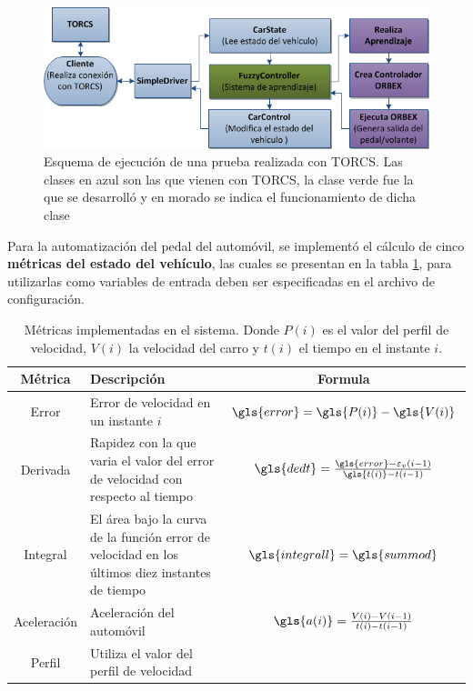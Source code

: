 \begin{figure}[!htb]
\centering
\includegraphics[width=0.6\linewidth]{figures/Diseno.png}
\caption{Esquema de ejecución de una prueba realizada con TORCS. Las clases en azul son las que vienen con TORCS, la clase verde fue la que se desarrolló y en morado se indica el funcionamiento de dicha clase}
\label{fig:esqT}
\end{figure}     

Para la automatización del pedal del automóvil, se implementó el cálculo de cinco \textbf{métricas del estado del vehículo}, las cuales se presentan en la tabla \ref{tab:metricas}, para utilizarlas como variables de entrada deben ser especificadas en el archivo de configuración.

\begin{table}[htb]
\begin{tabular}{|c|p{7.5cm}|c|}
\hline 
\rowcolor[gray]{0.9} \textbf{Métrica} & {\hspace{2.5 cm} \textbf{Descripción}} & \textbf{Formula} \\ 
\hline \hline
Error & Error de velocidad en un instante $i$ & \parbox{4cm}{\vspace{1 mm} $\gls{error} = \gls{P(i)} - \gls{V(i)}$ \vspace{0.5 mm}} \\ 
\hline 
Derivada & Rapidez con la que varia el valor del error de velocidad con respecto al tiempo & \parbox{4cm}{\vspace{1 mm}$\gls{dedt} = \frac{\gls{error}-\varepsilon_v(i-1)}{\gls{t(i)}-t(i-1)}$\vspace{0.5 mm}} \\ 
\hline 
Integral & El área bajo la curva de la función error de velocidad en los últimos diez instantes de tiempo & \parbox{5.6cm}{\vspace{1 mm}$\gls{integrall} = \gls{summod}$} \\ 
\hline 
Aceleración & Aceleración del automóvil & \parbox{4cm}{\vspace{1 mm}$\gls{a(i)} = \frac{V(i)-V(i-1)}{t(i)-t(i-1)}$\vspace{0.5 mm}} \\ 
\hline 
Perfil & Utiliza el valor del perfil de velocidad & \\ 
\hline 
\end{tabular} 
\caption{Métricas implementadas en el sistema. Donde $P(i)$ es el valor del perfil de velocidad, $V(i)$ la velocidad del carro y $t(i)$ el tiempo en el instante $i$. }
\label{tab:metricas}
\end{table}

